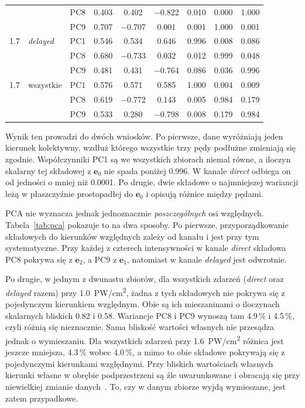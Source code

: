 \documentclass[12pt,a4paper]{article}
\newcommand{\PWcm}{PW/cm\textsuperscript{2}}
\begin{document}
\begin{table}[!h]
\begin{tabular}{c l c ccc ccc}
 &  & PC8 & \num{0.403} & \num{0.402} & \num{-0.822} & \num{0.010} & \num{0.000} & \num{1.000} \\
 &  & PC9 & \num{0.707} & \num{-0.707} & \num{0.001} & \num{0.001} & \num{1.000} & \num{0.001} \\
\midrule
\num{1.7} & \emph{delayed} & PC1 & \num{0.546} & \num{0.534} & \num{0.646} & \num{0.996} & \num{0.008} & \num{0.086} \\
 &  & PC8 & \num{0.680} & \num{-0.733} & \num{0.032} & \num{0.012} & \num{0.999} & \num{0.048} \\
 &  & PC9 & \num{0.481} & \num{0.431} & \num{-0.764} & \num{0.086} & \num{0.036} & \num{0.996} \\
\midrule
\num{1.7} & wszystkie & PC1 & \num{0.576} & \num{0.571} & \num{0.585} & \num{1.000} & \num{0.004} & \num{0.009} \\
 &  & PC8 & \num{0.619} & \num{-0.772} & \num{0.143} & \num{0.005} & \num{0.984} & \num{0.179} \\
 &  & PC9 & \num{0.533} & \num{0.280} & \num{-0.798} & \num{0.008} & \num{0.179} & \num{0.984} \\
\bottomrule
\end{tabular}
\end{table}

Wynik ten prowadzi do dwóch wniosków. Po pierwsze, dane wyróżniają
jeden kierunek kolektywny, wzdłuż którego wszystkie trzy pędy
podłużne zmieniają się zgodnie. Współczynniki PC1 są we wszystkich
zbiorach niemal równe, a iloczyn skalarny tej składowej z
$\mathbf{e}_0$ nie spada poniżej \num{0.996}. W kanale \emph{direct}
odbiega on od jedności o mniej niż \num{0.0001}. Po drugie, dwie
składowe o najmniejszej wariancji leżą w płaszczyźnie prostopadłej do
$\mathbf{e}_0$ i opisują różnice między pędami.

PCA nie wyznacza jednak jednoznacznie \emph{poszczególnych} osi
względnych. Tabela~\ref{tab:pca} pokazuje to na dwa sposoby. Po
pierwsze, przyporządkowanie składowych do kierunków względnych zależy
od kanału i jest przy tym systematyczne. Przy każdej z czterech
intensywności w kanale \emph{direct} składowa PC8 pokrywa się z
$\mathbf{e}_2$, a PC9 z $\mathbf{e}_1$, natomiast w kanale
\emph{delayed} jest odwrotnie. 

Po drugie, w jednym z dwunastu
zbiorów, dla wszystkich zdarzeń (\emph{direct} oraz \emph{delayed} razem) przy \num{1.0}~\PWcm, żadna z tych
składowych nie pokrywa się z pojedynczym kierunkiem względnym. Obie
są ich mieszaninami o iloczynach skalarnych bliskich \num{0.82} i
\num{0.58}. Wariancje PC8 i PC9 wynoszą tam \num{4.9}\,\% i
\num{4.5}\,\%, czyli różnią się nieznacznie. Sama bliskość wartości
własnych nie przesądza jednak o wymieszaniu. Dla wszystkich zdarzeń
przy \num{1.6}~\PWcm{} różnica jest jeszcze mniejsza, \num{4.3}\,\%
wobec \num{4.0}\,\%, a mimo to obie składowe pokrywają się z
pojedynczymi kierunkami względnymi. Przy bliskich wartościach
własnych kierunki własne w obrębie podprzestrzeni są źle uwarunkowane
i obracają się przy niewielkiej zmianie danych~\cite{Jolliffe2002}.
To, czy w danym zbiorze wyjdą wymieszane, jest zatem przypadkowe.
\end{document}
